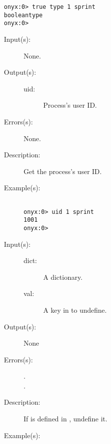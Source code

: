 \begin{description}
\begin{description}
\begin{verbatim}
onyx:0> true type 1 sprint
booleantype
onyx:0>
		\end{verbatim}
	\end{description}
\label{systemdict:uid}
\item[{\onyxop{--}{uid}{uid}}: ]
	\begin{description}\item[]
	\item[Input(s): ] None.
	\item[Output(s): ]
		\begin{description}\item[]
		\item[uid: ]
			Process's user ID.
		\end{description}
	\item[Errors(s): ] None.
	\item[Description: ]
		Get the process's user ID.
	\item[Example(s): ]\begin{verbatim}

onyx:0> uid 1 sprint
1001
onyx:0>
		\end{verbatim}
	\end{description}
\label{systemdict:undef}
\item[{\onyxop{dict key}{undef}{--}}: ]
	\begin{description}\item[]
	\item[Input(s): ]
		\begin{description}\item[]
		\item[dict: ]
			A dictionary.
		\item[val: ]
			A key in  to undefine.
		\end{description}
	\item[Output(s): ] None
	\item[Errors(s): ]
		\begin{description}\item[]
		\item[.]
		\item[.]
		\end{description}
	\item[Description: ]
		If  is defined in , undefine it.
	\item[Example(s): ]\begin{verbatim}


\end{verbatim}
\end{description}
\end{description}
